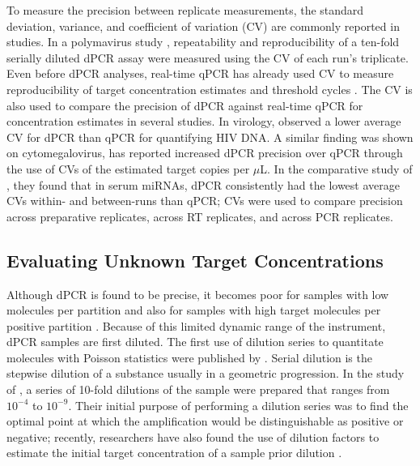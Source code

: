 To measure the precision between replicate measurements, the standard deviation, variance, and coefficient of variation (CV) are commonly reported in studies. In a polymavirus study \cite{Arvia2017}, repeatability and reproducibility of a ten-fold serially diluted dPCR assay were measured using the CV of each run's triplicate. Even before dPCR analyses, real-time qPCR has already used CV to measure reproducibility of target concentration estimates and threshold cycles \cite{Cook2009, Lai2003}. The CV is also used to compare the precision of dPCR against real-time qPCR for concentration estimates in several studies. In virology,  observed a lower average CV for dPCR than qPCR for quantifying HIV DNA. A similar finding was shown on cytomegalovirus,  has reported increased dPCR precision over qPCR through the use of CVs of the estimated target copies per \(\mu\)L. In the comparative study of , they found that in serum miRNAs, dPCR consistently had the lowest average CVs within- and between-runs than qPCR; CVs were used to compare precision across preparative replicates, across RT replicates, and across PCR replicates.

\subsection{Evaluating Unknown Target Concentrations}
\label{sec:ch2_perfeval_essentialMetrics}
Although dPCR is found to be precise, it becomes poor for samples with low molecules per partition and also for samples with high target molecules per positive partition \cite{Huggett2013_MIQEGuidelines}. Because of this limited dynamic range of the instrument, dPCR samples are first diluted. The first use of dilution series to quantitate molecules with Poisson statistics were published by . Serial dilution is the stepwise dilution of a substance usually in a geometric progression. In the study of , a series of 10-fold dilutions of the sample were prepared that ranges from \(10^{-4}\) to \(10^{-9}\). Their initial purpose of performing a dilution series was to find the optimal point at which the amplification would be distinguishable as positive or negative; recently, researchers have also found the use of dilution factors to estimate the initial target concentration of a sample prior dilution \cite{Gou2018, Zhu2017}. 

